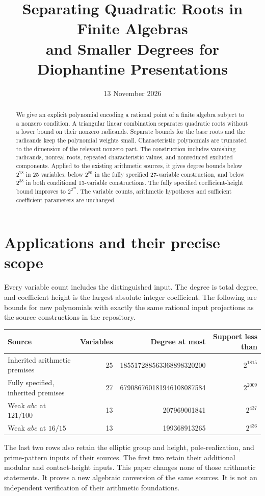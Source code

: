 \documentclass[11pt,a4paper]{article}
\title{Separating Quadratic Roots in Finite Algebras\\and Smaller Degrees for Diophantine Presentations}
\author{}\date{13 November 2026}
\begin{document}
\maketitle
\begin{abstract}
We give an explicit polynomial encoding a rational point of a finite algebra
subject to a nonzero condition. A triangular linear combination separates
quadratic roots without a lower bound on their nonzero radicands. Separate
bounds for the base roots and the radicands keep the polynomial weights
small. Characteristic polynomials are truncated to the dimension of the
relevant nonzero part. The construction includes vanishing radicands,
nonreal roots, repeated characteristic values, and nonreduced excluded
components. Applied to the existing arithmetic sources, it gives degree
bounds below $2^{78}$ in 25 variables, below $2^{80}$ in the fully specified
27-variable construction, and below $2^{38}$ in both conditional
13-variable constructions. The fully specified coefficient-height bound
improves to $2^{2^{92}}$. The variable counts, arithmetic hypotheses and
sufficient coefficient parameters are unchanged.
\end{abstract}

\section{Applications and their precise scope}
Every variable count includes the distinguished input. The degree is total
degree, and coefficient height is the largest absolute integer coefficient.
The following are bounds for new polynomials with exactly the same rational
input projections as the source constructions in the repository.
\begin{center}\small
\begin{tabular}{lrrr}
\toprule
Source & Variables & Degree at most & Support less than\\\midrule
Inherited arithmetic premises &25&185517288563368898320200&$2^{1815}$\\
Fully specified, inherited premises &27&679086760181946108087584&$2^{2009}$\\
Weak $abc$ at $121/100$ &13&207969001841&$2^{437}$\\
Weak $abc$ at $16/15$ &13&199368913265&$2^{436}$\\\bottomrule
\end{tabular}\end{center}
The last two rows also retain the elliptic group and height, pole-realization,
and prime-pattern inputs of their sources. The first two retain their
additional modular and contact-height inputs. This paper changes none of
those arithmetic statements. It proves a new algebraic conversion of the
same sources. It is not an independent verification of their arithmetic
foundations.
\end{document}

